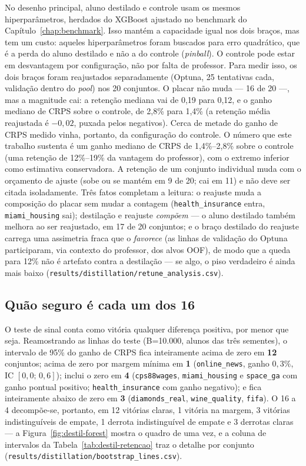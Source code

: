 No desenho principal, aluno destilado e controle usam os mesmos
hiperparâmetros, herdados do XGBoost ajustado no benchmark do
Capítulo~\ref{chap:benchmark}. Isso mantém a capacidade igual nos dois
braços, mas tem um custo: aqueles hiperparâmetros foram buscados para
erro quadrático, que é a perda do aluno destilado e não a do controle
(\emph{pinball}). O controle pode estar em desvantagem por
configuração, não por falta de professor. Para medir isso, os dois
braços foram reajustados separadamente (Optuna, 25 tentativas cada,
validação dentro do \emph{pool}) nos 20 conjuntos. O placar não muda
--- 16 de 20 ---, mas a magnitude cai: a retenção mediana vai de 0,19
para 0,12, e o ganho mediano de CRPS sobre o controle, de 2,8\% para
1,4\% (a retenção média reajustada é $-0{,}02$, puxada pelos
negativos). Cerca de metade do ganho de CRPS medido vinha, portanto,
da configuração do controle. O número que este
trabalho sustenta é um ganho mediano de CRPS de 1,4\%--2,8\% sobre o
controle (uma retenção de 12\%--19\% da vantagem do professor), com
o extremo inferior como
estimativa conservadora. A retenção de um conjunto individual muda com
o orçamento de ajuste (sobe ou se mantém em 9 de 20; cai em 11) e não
deve ser citada isoladamente. Três fatos completam a leitura: o
reajuste muda a composição do placar sem mudar a contagem
(\texttt{health\_\allowbreak insurance} entra,
\texttt{miami\_\allowbreak housing} sai); destilação e reajuste
\emph{compõem} --- o aluno destilado também melhora ao ser reajustado,
em 17 de 20 conjuntos; e o braço destilado do reajuste carrega uma
assimetria fraca que o \emph{favorece} (as linhas de validação do
Optuna participaram, via contexto do professor, dos alvos OOF), de
modo que a queda para 12\% não é artefato contra a destilação --- se
algo, o piso verdadeiro é ainda mais baixo
(\texttt{results/\allowbreak distillation/\allowbreak retune\_\allowbreak analysis.csv}).

\subsection{Quão seguro é cada um dos 16}
\label{sec:destil-bootstrap}

O teste de sinal conta como vitória qualquer diferença positiva, por
menor que seja. Reamostrando as linhas do teste (B=10.000, alunos das
três sementes), o intervalo de 95\% do ganho de CRPS fica inteiramente
acima de zero em \textbf{12} conjuntos; acima de zero por margem
mínima em \textbf{1} (\texttt{online\_news}, ganho $0{,}3\%$, IC
$[0{,}0;\,0{,}6]$); inclui o zero em \textbf{4} (\texttt{cps88wages},
\texttt{miami\_\allowbreak housing} e \texttt{space\_ga} com ganho
pontual positivo; \texttt{health\_\allowbreak insurance} com ganho
negativo); e fica inteiramente abaixo de zero em \textbf{3}
(\texttt{diamonds\_\allowbreak real}, \texttt{wine\_\allowbreak quality},
\texttt{fifa}). O 16 a 4 decompõe-se, portanto, em 12 vitórias claras, 1 vitória na
margem, 3 vitórias indistinguíveis de empate, 1 derrota indistinguível
de empate e 3 derrotas claras --- a Figura~\ref{fig:destil-forest} mostra o quadro
de uma vez, e a coluna de intervalos da
Tabela~\ref{tab:destil-retencao} traz o detalhe por conjunto
(\texttt{results/\allowbreak distillation/\allowbreak bootstrap\_\allowbreak lines.csv}).

